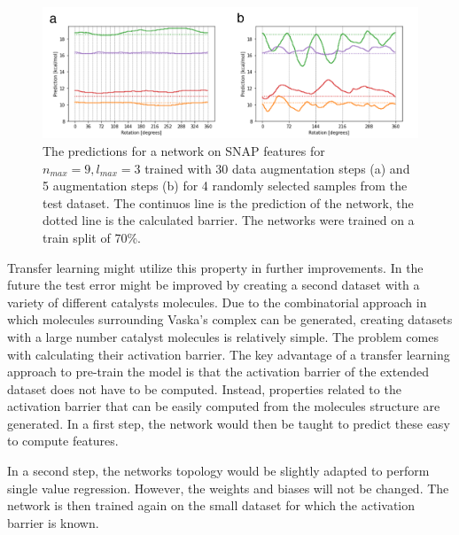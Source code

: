 \begin{figure}[H]
  \centering
  \includegraphics[width=1.0\textwidth]{figures/regression/snap/snap-rotation.png}
  \caption[Evaluation of SNAP rotational invariance]{
  The predictions for a network on SNAP features for $n_{max}=9, l_{max}=3$ trained with 30 data augmentation steps (a) 
  and 5 augmentation steps (b) for 4 randomly selected samples from the test dataset.
  The continuos line is the prediction of the network, the dotted line is the calculated barrier.
  The networks were trained on a train split of 70\%.
  }
  \label{fig:snap_roation}

\end{figure}
Transfer learning might utilize this property in further improvements.
In the future the test error might be improved by creating a second dataset with a variety of different catalysts molecules.
Due to the combinatorial approach in which molecules surrounding Vaska's complex can be generated, 
creating datasets with a large number catalyst molecules is relatively simple.
The problem comes with calculating their activation barrier.
The key advantage of a transfer learning approach to pre-train the model is that the activation barrier of the extended dataset does not have to be computed.
Instead, properties related to the activation barrier that can be easily computed from the molecules structure are generated.
In a first step, the network would then be taught to predict these easy to compute features.

In a second step, the networks topology would be slightly adapted to perform single value regression.
However, the weights and biases will not be changed.
The network is then trained again on the small dataset for which the activation barrier is known.

